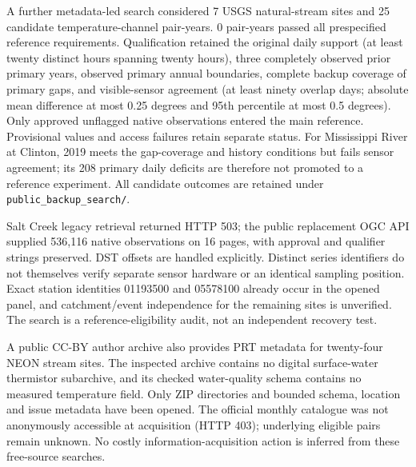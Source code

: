 A further metadata-led search considered 7 USGS natural-stream sites and 25 candidate temperature-channel pair-years. 0 pair-years passed all prespecified reference requirements. Qualification retained the original daily support (at least twenty distinct hours spanning twenty hours), three completely observed prior primary years, observed primary annual boundaries, complete backup coverage of primary gaps, and visible-sensor agreement (at least ninety overlap days; absolute mean difference at most 0.25 degrees and 95th percentile at most 0.5 degrees). Only approved unflagged native observations entered the main reference. Provisional values and access failures retain separate status. For Mississippi River at Clinton, 2019 meets the gap-coverage and history conditions but fails sensor agreement; its 208 primary daily deficits are therefore not promoted to a reference experiment. All candidate outcomes are retained under \texttt{public\_backup\_search/}.

Salt Creek legacy retrieval returned HTTP 503; the public replacement OGC API supplied 536,116 native observations on 16 pages, with approval and qualifier strings preserved. DST offsets are handled explicitly. Distinct series identifiers do not themselves verify separate sensor hardware or an identical sampling position. Exact station identities 01193500 and 05578100 already occur in the opened panel, and catchment/event independence for the remaining sites is unverified. The search is a reference-eligibility audit, not an independent recovery test.

A public CC-BY author archive also provides PRT metadata for twenty-four NEON stream sites. The inspected archive contains no digital surface-water thermistor subarchive, and its checked water-quality schema contains no measured temperature field. Only ZIP directories and bounded schema, location and issue metadata have been opened. The official monthly catalogue was not anonymously accessible at acquisition (HTTP 403); underlying eligible pairs remain unknown. No costly information-acquisition action is inferred from these free-source searches.
